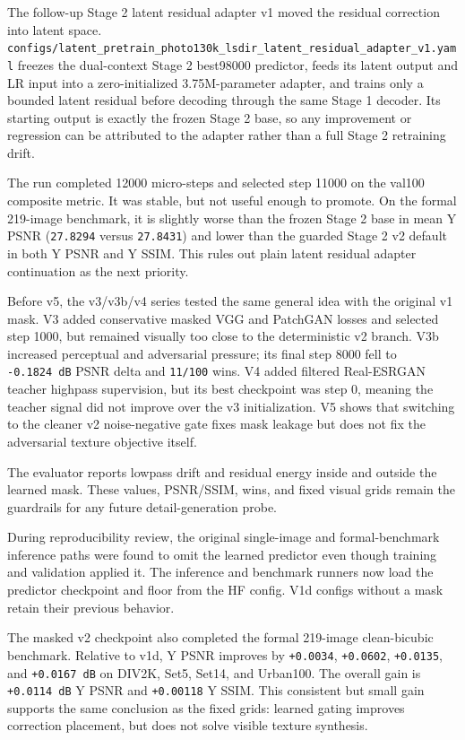 \documentclass[
  10pt,
]{article}
\begin{document}
The follow-up Stage 2 latent residual adapter v1 moved the residual
correction into latent space.
\texttt{configs/latent\_pretrain\_photo130k\_lsdir\_latent\_residual\_adapter\_v1.yaml}
freezes the dual-context Stage 2 best98000 predictor, feeds its latent
output and LR input into a zero-initialized 3.75M-parameter adapter, and
trains only a bounded latent residual before decoding through the same
Stage 1 decoder. Its starting output is exactly the frozen Stage 2 base,
so any improvement or regression can be attributed to the adapter rather
than a full Stage 2 retraining drift.

The run completed 12000 micro-steps and selected step 11000 on the
val100 composite metric. It was stable, but not useful enough to
promote. On the formal 219-image benchmark, it is slightly worse than
the frozen Stage 2 base in mean Y PSNR (\texttt{27.8294} versus
\texttt{27.8431}) and lower than the guarded Stage 2 v2 default in both
Y PSNR and Y SSIM. This rules out plain latent residual adapter
continuation as the next priority.

Before v5, the v3/v3b/v4 series tested the same general idea with the
original v1 mask. V3 added conservative masked VGG and PatchGAN losses
and selected step 1000, but remained visually too close to the
deterministic v2 branch. V3b increased perceptual and adversarial
pressure; its final step 8000 fell to \texttt{-0.1824\ dB} PSNR delta
and \texttt{11/100} wins. V4 added filtered Real-ESRGAN teacher highpass
supervision, but its best checkpoint was step 0, meaning the teacher
signal did not improve over the v3 initialization. V5 shows that
switching to the cleaner v2 noise-negative gate fixes mask leakage but
does not fix the adversarial texture objective itself.

The evaluator reports lowpass drift and residual energy inside and
outside the learned mask. These values, PSNR/SSIM, wins, and fixed
visual grids remain the guardrails for any future detail-generation
probe.

During reproducibility review, the original single-image and
formal-benchmark inference paths were found to omit the learned
predictor even though training and validation applied it. The inference
and benchmark runners now load the predictor checkpoint and floor from
the HF config. V1d configs without a mask retain their previous
behavior.

The masked v2 checkpoint also completed the formal 219-image
clean-bicubic benchmark. Relative to v1d, Y PSNR improves by
\texttt{+0.0034}, \texttt{+0.0602}, \texttt{+0.0135}, and
\texttt{+0.0167\ dB} on DIV2K, Set5, Set14, and Urban100. The overall
gain is \texttt{+0.0114\ dB} Y PSNR and \texttt{+0.00118} Y SSIM. This
consistent but small gain supports the same conclusion as the fixed
grids: learned gating improves correction placement, but does not solve
visible texture synthesis.
\end{document}
